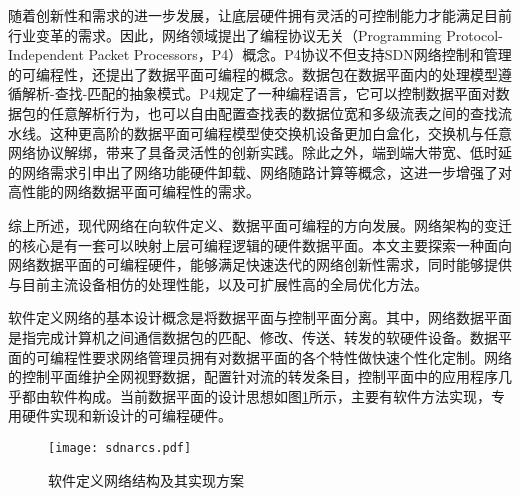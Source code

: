 随着创新性和需求的进一步发展，让底层硬件拥有灵活的可控制能力才能满足目前行业变革的需求。因此，网络领域提出了编程协议无关（Programming Protocol-Independent Packet Processors，P4）概念。P4协议不但支持SDN网络控制和管理的可编程性，还提出了数据平面可编程的概念。数据包在数据平面内的处理模型遵循解析-查找-匹配的抽象模式。P4规定了一种编程语言，它可以控制数据平面对数据包的任意解析行为，也可以自由配置查找表的数据位宽和多级流表之间的查找流水线。这种更高阶的数据平面可编程模型使交换机设备更加白盒化，交换机与任意网络协议解绑，带来了具备灵活性的创新实践。除此之外，端到端大带宽、低时延的网络需求引申出了网络功能硬件卸载、网络随路计算等概念，这进一步增强了对高性能的网络数据平面可编程性的需求。

综上所述，现代网络在向软件定义、数据平面可编程的方向发展。网络架构的变迁的核心是有一套可以映射上层可编程逻辑的硬件数据平面。本文主要探索一种面向网络数据平面的可编程硬件，能够满足快速迭代的网络创新性需求，同时能够提供与目前主流设备相仿的处理性能，以及可扩展性高的全局优化方法。


软件定义网络的基本设计概念是将数据平面与控制平面分离。其中，网络数据平面是指完成计算机之间通信数据包的匹配、修改、传送、转发的软硬件设备。数据平面的可编程性要求网络管理员拥有对数据平面的各个特性做快速个性化定制。网络的控制平面维护全网视野数据，配置针对流的转发条目，控制平面中的应用程序几乎都由软件构成。当前数据平面的设计思想如图\ref{sdnarcs}所示，主要有软件方法实现，专用硬件实现和新设计的可编程硬件。

\begin{figure}[!ht]
	\centering
	\texttt{[image: sdnarcs.pdf]}
	\caption{软件定义网络结构及其实现方案} \label{sdnarcs}
\end{figure}

